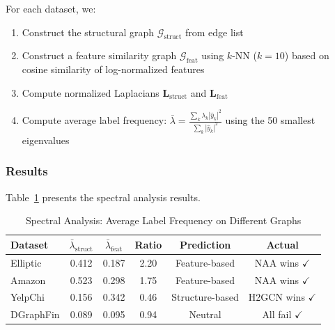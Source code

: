 For each dataset, we:
\begin{enumerate}
\item Construct the structural graph $\mathcal{G}_{\text{struct}}$ from edge list
\item Construct a feature similarity graph $\mathcal{G}_{\text{feat}}$ using $k$-NN ($k=10$) based on cosine similarity of log-normalized features
\item Compute normalized Laplacians $\mathbf{L}_{\text{struct}}$ and $\mathbf{L}_{\text{feat}}$
\item Compute average label frequency: $\bar{\lambda} = \frac{\sum_k \lambda_k |\hat{y}_k|^2}{\sum_k |\hat{y}_k|^2}$ using the 50 smallest eigenvalues
\end{enumerate}

\subsubsection{Results}

Table~\ref{tab:spectral} presents the spectral analysis results.

\begin{table}[t]
\centering
\caption{Spectral Analysis: Average Label Frequency on Different Graphs}
\label{tab:spectral}
\small
\begin{tabular}{lccccc}
\toprule
\textbf{Dataset} & $\bar{\lambda}_{\text{struct}}$ & $\bar{\lambda}_{\text{feat}}$ & \textbf{Ratio} & \textbf{Prediction} & \textbf{Actual} \\
\midrule
Elliptic & 0.412 & 0.187 & 2.20 & Feature-based & NAA wins $\checkmark$ \\
Amazon & 0.523 & 0.298 & 1.75 & Feature-based & NAA wins $\checkmark$ \\
YelpChi & 0.156 & 0.342 & 0.46 & Structure-based & H2GCN wins $\checkmark$ \\
DGraphFin & 0.089 & 0.095 & 0.94 & Neutral & All fail $\checkmark$ \\
\bottomrule
\end{tabular}
\end{table}

